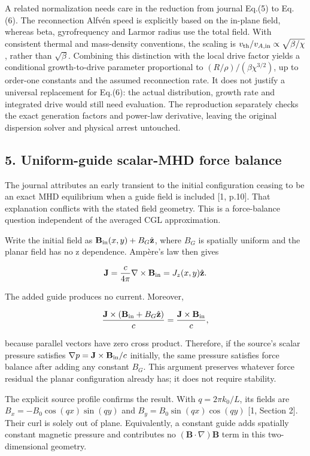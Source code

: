 A related normalization needs care in the reduction from journal Eq.(5)
to Eq.(6). The reconnection Alfvén speed is explicitly based on the
in-plane field, whereas beta, gyrofrequency and Larmor radius use the
total field. With consistent thermal and mass-density conventions, the
scaling is \(v_{\rm th}/v_{A,{\rm in}}\propto\sqrt{\beta/\chi}\), rather
than \(\sqrt\beta\). Combining this distinction with the local drive
factor yields a conditional growth-to-drive parameter proportional to
\((R/\rho)/(\beta\chi^{3/2})\), up to order-one constants and the
assumed reconnection rate. It does not justify a universal replacement
for Eq.(6): the actual distribution, growth rate and integrated drive
would still need evaluation. The reproduction separately checks the
exact generation factors and power-law derivative, leaving the original
dispersion solver and physical arrest untouched.

\subsection{5. Uniform-guide scalar-MHD force
balance}\label{uniform-guide-scalar-mhd-force-balance}

The journal attributes an early transient to the initial configuration
ceasing to be an exact MHD equilibrium when a guide field is included
{[}1, p.10{]}. That explanation conflicts with the stated field
geometry. This is a force-balance question independent of the averaged
CGL approximation.

Write the initial field as
\(\mathbf B_{\rm in}(x,y)+B_G\hat{\mathbf z}\), where \(B_G\) is
spatially uniform and the planar field has no z dependence. Ampère's law
then gives

\[
\mathbf J=\frac{c}{4\pi}\nabla\times\mathbf B_{\rm in}
=J_z(x,y)\hat{\mathbf z}.
\]

The added guide produces no current. Moreover,

\[
\frac{\mathbf J\times(\mathbf B_{\rm in}+B_G\hat{\mathbf z})}{c}
=\frac{\mathbf J\times\mathbf B_{\rm in}}{c},
\]

because parallel vectors have zero cross product. Therefore, if the
source's scalar pressure satisfies
\(\nabla p=\mathbf J\times\mathbf B_{\rm in}/c\) initially, the same
pressure satisfies force balance after adding any constant \(B_G\). This
argument preserves whatever force residual the planar configuration
already has; it does not require stability.

The explicit source profile confirms the result. With \(q=2\pi k_0/L\),
its fields are \(B_x=-B_0\cos(qx)\sin(qy)\) and
\(B_y=B_0\sin(qx)\cos(qy)\) {[}1, Section 2{]}. Their curl is solely out
of plane. Equivalently, a constant guide adds spatially constant
magnetic pressure and contributes no \((\mathbf B\cdot\nabla)\mathbf B\)
term in this two-dimensional geometry.


